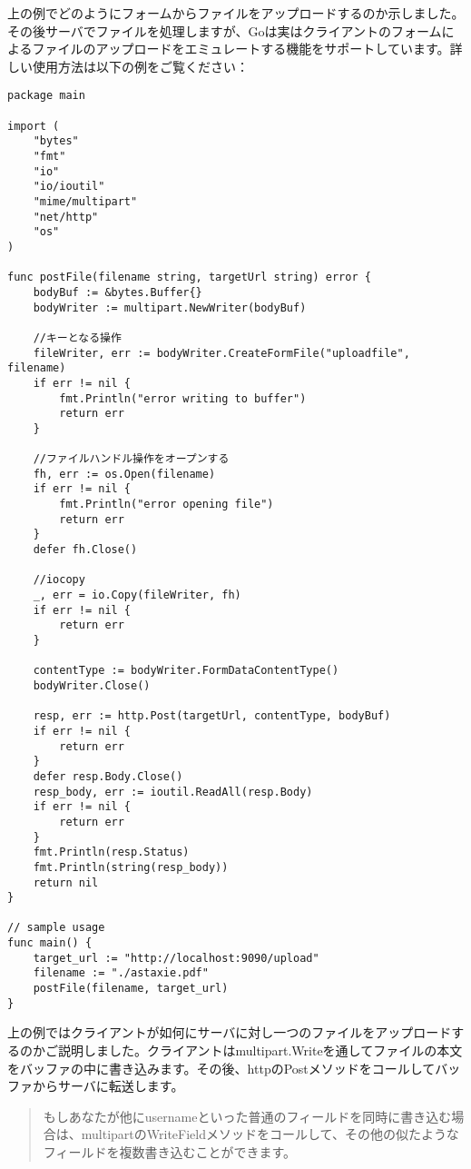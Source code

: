 上の例でどのようにフォームからファイルをアップロードするのか示しました。その後サーバでファイルを処理しますが、Goは実はクライアントのフォームによるファイルのアップロードをエミュレートする機能をサポートしています。詳しい使用方法は以下の例をご覧ください：

\begin{lstlisting}[numbers=none]
package main

import (
    "bytes"
    "fmt"
    "io"
    "io/ioutil"
    "mime/multipart"
    "net/http"
    "os"
)

func postFile(filename string, targetUrl string) error {
    bodyBuf := &bytes.Buffer{}
    bodyWriter := multipart.NewWriter(bodyBuf)

    //キーとなる操作
    fileWriter, err := bodyWriter.CreateFormFile("uploadfile", filename)
    if err != nil {
        fmt.Println("error writing to buffer")
        return err
    }

    //ファイルハンドル操作をオープンする
    fh, err := os.Open(filename)
    if err != nil {
        fmt.Println("error opening file")
        return err
    }
    defer fh.Close()

    //iocopy
    _, err = io.Copy(fileWriter, fh)
    if err != nil {
        return err
    }

    contentType := bodyWriter.FormDataContentType()
    bodyWriter.Close()

    resp, err := http.Post(targetUrl, contentType, bodyBuf)
    if err != nil {
        return err
    }
    defer resp.Body.Close()
    resp_body, err := ioutil.ReadAll(resp.Body)
    if err != nil {
        return err
    }
    fmt.Println(resp.Status)
    fmt.Println(string(resp_body))
    return nil
}

// sample usage
func main() {
    target_url := "http://localhost:9090/upload"
    filename := "./astaxie.pdf"
    postFile(filename, target_url)
}
\end{lstlisting}

上の例ではクライアントが如何にサーバに対し一つのファイルをアップロードするのかご説明しました。クライアントはmultipart.Writeを通してファイルの本文をバッファの中に書き込みます。その後、httpのPostメソッドをコールしてバッファからサーバに転送します。

\begin{quote}
もしあなたが他にusernameといった普通のフィールドを同時に書き込む場合は、multipartのWriteFieldメソッドをコールして、その他の似たようなフィールドを複数書き込むことができます。
\end{quote}

